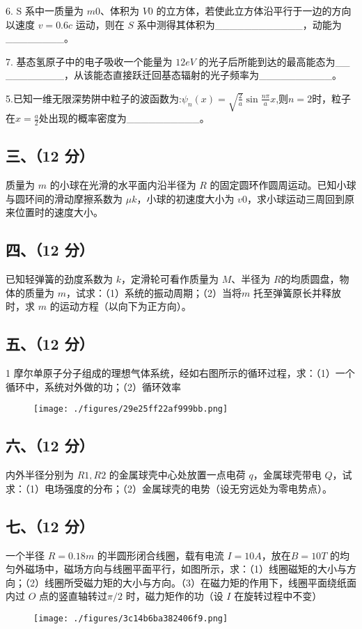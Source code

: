 6. S 系中一质量为 $m0$、体积为 $V0$ 的立方体，若使此立方体沿平行于一边的方向以速度 $v=0.6c$ 运动，则在 $S$ 系中测得其体积为____________，动能为________。

7. 基态氢原子中的电子吸收一个能量为 $12eV$ 的光子后所能到达的最高能态为__
________，从该能态直接跃迁回基态辐射的光子频率为__________。

5.已知一维无限深势阱中粒子的波函数为:$\psi_n(x)=\sqrt{\frac{2}{a}}\sin\frac{n\pi}{a}x$,则$n=2$时，粒子在$x=\frac{a}{2}$处出现的概率密度为__________。
\subsection{三、（12 分）}
质量为 $m$ 的小球在光滑的水平面内沿半径为 $R$ 的固定圆环作圆周运动。已知小球与圆环间的滑动摩擦系数为 $\mu k$，小球的初速度大小为 $v0$，求小球运动三周回到原来位置时的速度大小。
\subsection{四、（12 分）}
已知轻弹簧的劲度系数为 $k$，定滑轮可看作质量为 $M$、半径为 $R$的均质圆盘，物体的质量为 $m$，试求：（1）系统的振动周期；（2）当将$m$ 托至弹簧原长并释放时，求 $m$ 的运动方程（以向下为正方向）。
\subsection{五、（12 分）}
1 摩尔单原子分子组成的理想气体系统，经如右图所示的循环过程，求：（1）一个循环中，系统对外做的功；（2）循环效率
\begin{figure}[ht]
\centering
\texttt{[image: ./figures/29e25ff22af999bb.png]}
\caption{} \label{fig_NJU05_1}
\end{figure}
\subsection{六、（12 分）}
内外半径分别为 $R1,R2$ 的金属球壳中心处放置一点电荷 $q$，金属球壳带电 $Q$，试求：（1）电场强度的分布；（2）金属球壳的电势（设无穷远处为零电势点）。
\subsection{七、（12 分）}
一个半径 $R=0.18m$ 的半圆形闭合线圈，载有电流 $I=10A$，放在$B=10T$ 的均匀外磁场中，磁场方向与线圈平面平行，如图所示，求：（1）线圈磁矩的大小与方向；（2）线圈所受磁力矩的大小与方向。（3）在磁力矩的作用下，线圈平面绕纸面内过 $O$ 点的竖直轴转过$\pi/2$ 时，磁力矩作的功（设 $I$ 在旋转过程中不变）
\begin{figure}[ht]
\centering
\texttt{[image: ./figures/3c14b6ba382406f9.png]}
\caption{} \label{fig_NJU05_2}
\end{figure}
